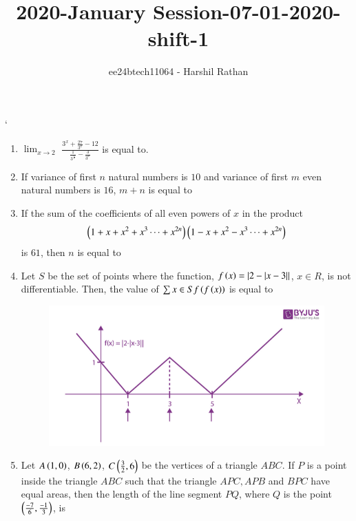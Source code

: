 \documentclass[journal,12pt,twocolumn]{IEEEtran}
\theoremstyle{remark}
\begin{document}

\vspace{3cm}

\title{2020-January Session-07-01-2020-shift-1}
\author{ee24btech11064 - Harshil Rathan}
\maketitle
\newpage
\bigskip

\renewcommand{\thefigure}{\theenumi}
`\renewcommand{\thetable}{\theenumi}
\begin{enumerate}
\item $\lim_{x\to2}$ $\frac{3^x+\frac{27}{3^x}-12}{\frac{1}{3^\frac{x}{2}}-\frac{3}{3^x}}$ is equal to.\\
\item If variance of first $n$ natural numbers is $10$ and variance of first $m$ even natural numbers is $16$, $m + n$ is equal to\\
\item  If the sum of the coefficients of all even powers of $x$ in the product
\begin{align*}
    \left(1+x+x^2+x^3\cdots+x^{2n}\right)\left(1-x+x^2-x^3\cdots+x^{2n}\right)
\end{align*}
is $61$, then $n$ is equal to \\
\item Let $S$ be the set of points where the function, $f\left(x\right)=|2-|x-3||$, $x \in R$, is not differentiable. Then, the value of $\sum x \in S f\left(f\left(x\right)\right)$ is equal to
\begin{figure}[h!]
   \centering
   \includegraphics[width=\linewidth]{q24.png}
   \caption{}
   \label{stemplot}
\end{figure}
\item Let $A\left(1,0\right)$, $B\left(6,2\right)$, $C\left(\frac{3}{2},6\right)$ be the vertices of a triangle $ABC$. If $P$ is a point inside the triangle $ABC$ such that the triangle $APC,APB$ and $BPC$ have equal areas, then the length of the line segment $PQ$, where $Q$ is the point $\left(\frac{-7}{6},\frac{-1}{3}\right)$, is 
\end{enumerate}
\end{document}
